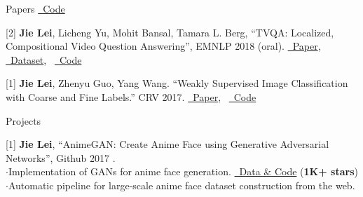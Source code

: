 \documentclass{resume} %
\begin{document}
\begin{rSection}{Papers}
{               \href{https://github.com/jayleicn/TVQA-PLUS}{\color{codelinkcolor}\faGithub~Code}
               }
    \item {[2] \textbf{Jie Lei}, Licheng Yu, Mohit Bansal, Tamara L. Berg, 
               ``TVQA: Localized, Compositional Video Question Answering'',
               EMNLP 2018 (oral).
               \href{https://arxiv.org/abs/1809.01696}{\color{codelinkcolor}\faFile~Paper},~
               \href{http://tvqa.cs.unc.edu/}{\color{codelinkcolor}\faDatabase~Dataset},~
               \href{https://github.com/jayleicn/TVQA}{\color{codelinkcolor}\faGithub~Code}
               }
    \item {[1] \textbf{Jie Lei}, Zhenyu Guo, Yang Wang.
                ``Weakly Supervised Image Classification with Coarse and Fine Labels.''
                CRV 2017.
                \href{https://www.cs.unc.edu/~jielei/pdfs/crv17_classification.pdf}{\color{codelinkcolor}\faFile~Paper},~
                \href{https://github.com/jayleicn/classification-with-coarse-fine-labels}{\color{codelinkcolor}\faGithub~Code}
                }
\end{rSection}


\begin{rSection}{Projects}
    \item {[1] \textbf{Jie Lei},
                ``AnimeGAN: Create Anime Face using Generative Adversarial Networks'',
                Github 2017 .
                \\ $\cdot$\quad Implementation of GANs for anime face generation. 
                \href{https://github.com/jayleicn/animeGAN}{\color{codelinkcolor}\faGithub~Data \& Code} (\textbf{1K+ stars})
                \\ $\cdot$\quad Automatic pipeline for large-scale anime face dataset construction from the web.}
\end{rSection}


\end{document}
